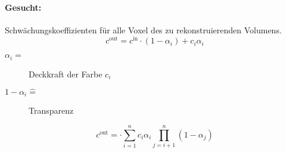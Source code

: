\paragraph{Gesucht:} Schwächungskoeffizienten für alle Voxel des zu rekonstruierenden Volumens.
\[ c^\text{out} = c^\text{in}\cdot\left( 1-\alpha_i \right) + c_i\alpha_i \]
\begin{description}
	\item[$\alpha_i =$]  Deckkraft der Farbe $c_i$
	\item[$1-\alpha_i \hat{=} $] Transparenz
\end{description}
\[ c^\text{out} = \cdot \sum_{i=1}^{n}c_i\alpha_i\prod_{j=i+1}^{n}\left(  1-\alpha_j \right) \]